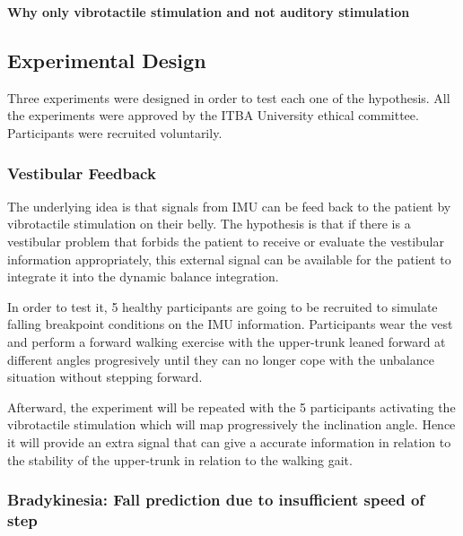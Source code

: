 \documentclass[conference]{IEEEtran}
\begin{document}
\textbf{Why only vibrotactile stimulation and not auditory stimulation}

\subsection{Experimental Design}

Three experiments were designed in order to test each one of the hypothesis.  All the experiments were approved by the ITBA University ethical committee.  Participants were recruited voluntarily.


\subsubsection{Vestibular Feedback}

The underlying idea is that signals from IMU can be feed back to the patient by vibrotactile stimulation on their belly.  The hypothesis is that if there is a vestibular problem that forbids the patient to receive or evaluate the vestibular information appropriately, this external signal can be available for the patient to integrate it into the dynamic balance integration.

In order to test it, 5 healthy participants are going to be recruited to simulate falling breakpoint conditions on the IMU information.  Participants wear the vest and perform a forward walking exercise with the upper-trunk leaned forward at different angles progresively until they can no longer cope with the unbalance situation without stepping forward.

Afterward, the experiment will be repeated with the 5 participants activating the vibrotactile stimulation which will map progressively the inclination angle.  Hence it will provide an extra signal that can give a accurate information in relation to the stability of the upper-trunk in relation to the walking gait.

\subsubsection{Bradykinesia: Fall prediction due to insufficient speed of step}
\end{document}
